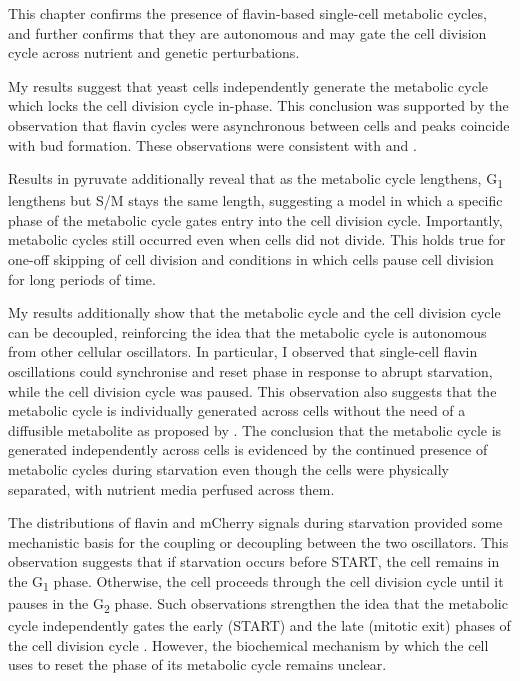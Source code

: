 This chapter confirms the presence of flavin-based single-cell metabolic cycles, and further confirms that they are autonomous and may gate the cell division cycle across nutrient and genetic perturbations.

My results suggest that yeast cells independently generate the metabolic cycle which locks the cell division cycle in-phase.
This conclusion was supported by the observation that flavin cycles were asynchronous between cells and peaks coincide with bud formation.
These observations were consistent with \textcite{papagiannakisAutonomousMetabolicOscillations2017} and \textcite{baumgartnerFlavinbasedMetabolicCycles2018}.

Results in pyruvate additionally reveal that as the metabolic cycle lengthens, G\textsubscript{1} lengthens but S/M stays the same length, suggesting a model in which a specific phase of the metabolic cycle gates entry into the cell division cycle.
Importantly, metabolic cycles still occurred even when cells did not divide.
This holds true for one-off skipping of cell division and conditions in which cells pause cell division for long periods of time.

My results additionally show that the metabolic cycle and the cell division cycle can be decoupled, reinforcing the idea that the metabolic cycle is autonomous from other cellular oscillators.
In particular, I observed that single-cell flavin oscillations could synchronise and reset phase in response to abrupt starvation, while the cell division cycle was paused.
This observation also suggests that the metabolic cycle is individually generated across cells without the need of a diffusible metabolite as proposed by \textcite{krishnaMinimalPushPull2018}.
The conclusion that the metabolic cycle is generated independently across cells is evidenced by the continued presence of metabolic cycles during starvation even though the cells were physically separated, with nutrient media perfused across them.

The distributions of flavin and mCherry signals during starvation provided some mechanistic basis for the coupling or decoupling between the two oscillators.
This observation suggests that if starvation occurs before START, the cell remains in the G\textsubscript{1} phase.
Otherwise, the cell proceeds through the cell division cycle until it pauses in the G\textsubscript{2} phase.
Such observations strengthen the idea that the metabolic cycle independently gates the early (START) and the late (mitotic exit) phases of the cell division cycle \parencite{ozsezenInferenceHighLevelInteraction2019}.
However, the biochemical mechanism by which the cell uses to reset the phase of its metabolic cycle remains unclear.


